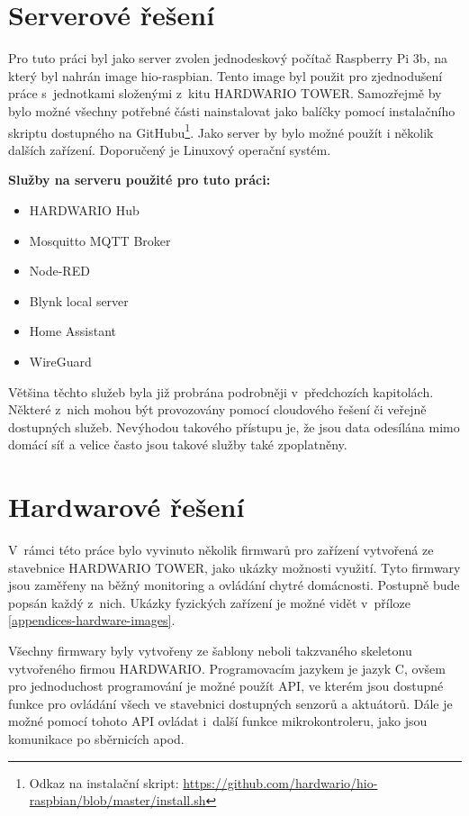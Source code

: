 \section{Serverové řešení}
Pro tuto práci byl jako server zvolen jednodeskový počítač Raspberry Pi 3b, na který byl nahrán image hio-raspbian. Tento image byl použit pro zjednodušení práce s~jednotkami složenými z~kitu HARDWARIO TOWER. Samozřejmě by bylo možné všechny potřebné části nainstalovat jako balíčky pomocí instalačního skriptu dostupného na GitHubu\footnote{Odkaz na instalační skript: \url{https://github.com/hardwario/hio-raspbian/blob/master/install.sh}}. 
Jako server by bylo možné použít i několik dalších zařízení. Doporučený je Linuxový operační systém.

\noindent\textbf{Služby na serveru použité pro tuto práci:}
\begin{itemize}
  \item HARDWARIO Hub
  \item Mosquitto MQTT Broker
  \item Node-RED
  \item Blynk local server
  \item Home Assistant
  \item WireGuard 
\end{itemize}

Většina těchto služeb byla již probrána podrobněji v~předchozích kapitolách.
Některé z~nich mohou být provozovány pomocí cloudového řešení či veřejně dostupných služeb. Nevýhodou takového přístupu je, že jsou data odesílána mimo domácí síť a velice často jsou takové služby také zpoplatněny.

\section{Hardwarové řešení} \label{hardware-implementation}
V~rámci této práce bylo vyvinuto několik firmwarů pro zařízení vytvořená ze stavebnice HARDWARIO TOWER, jako ukázky možnosti využití. Tyto firmwary jsou zaměřeny na běžný monitoring a ovládání chytré domácnosti. Postupně bude popsán každý z~nich. Ukázky fyzických zařízení je možné vidět v~příloze \ref{appendices-hardware-images}.

Všechny firmwary byly vytvořeny ze šablony neboli takzvaného skeletonu vytvořeného firmou HARDWARIO. Programovacím jazykem je jazyk C, ovšem pro jednoduchost programování je možné použít API, ve kterém jsou dostupné funkce pro ovládání všech ve stavebnici dostupných senzorů a aktuátorů. Dále je možné pomocí tohoto API ovládat i~další funkce mikrokontroleru, jako jsou komunikace po sběrnicích apod.

